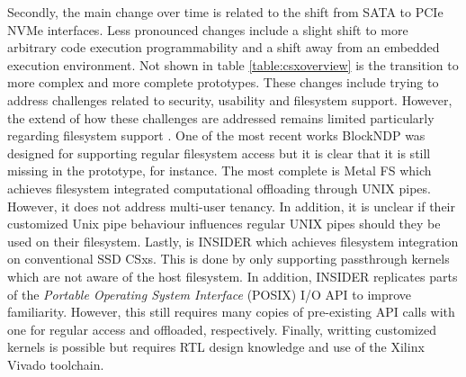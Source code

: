Secondly, the main change over time is related to the shift from SATA to PCIe
NVMe interfaces. Less pronounced changes include a slight shift to more
arbitrary code execution programmability and a shift away from an embedded
execution environment. Not shown in table \ref{table:csxoverview} is the
transition to more complex and more complete prototypes. These changes include
trying to address challenges related to security, usability and filesystem
support. However, the extend of how these challenges are addressed remains
limited particularly regarding filesystem support \cite{barbalacecomputational}.
One of the most recent works BlockNDP \cite{10.1145/3429357.3430519} was
designed for supporting regular filesystem access but it is clear that it is
still missing in the prototype, for instance\footnotemark[4]. The most complete
is Metal FS \cite{10.1145/3342195.3387557} which achieves filesystem integrated
computational offloading through UNIX pipes. However, it does not address
multi-user tenancy. In addition, it is unclear if their customized Unix pipe
behaviour influences regular UNIX pipes should they be used on their filesystem.
Lastly, is INSIDER \cite{234968} which achieves filesystem integration on
conventional SSD CSxs. This is done by only supporting passthrough kernels which
are not aware of the host filesystem. In addition, INSIDER replicates parts of
the \textit{Portable Operating System Interface} (POSIX) I/O API to improve
familiarity. However, this still requires many copies of pre-existing API calls
with one for regular access and offloaded, respectively. Finally, writting
customized kernels is possible but requires RTL design knowledge and use of the
Xilinx Vivado toolchain.


